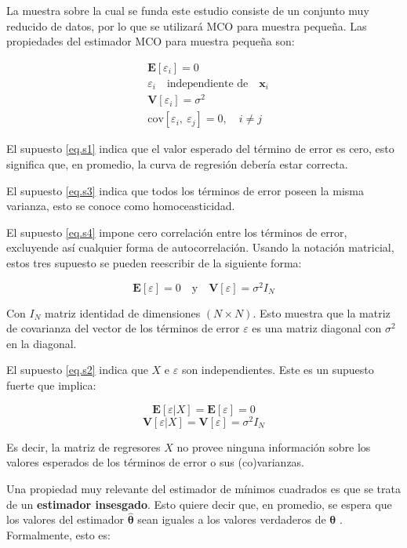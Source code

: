 La muestra sobre la cual se funda este estudio consiste de un conjunto muy reducido de datos, por lo que se utilizará MCO para muestra pequeña. Las propiedades del estimador MCO para muestra pequeña son:

\begin{align}
    & \label{eq.s1} \bm{E}[\varepsilon_i] = 0\\
    & \label{eq.s2} \varepsilon_i\quad\text{independiente de}\quad \bm{x}_i\\
    & \label{eq.s3} \bm{V}[\varepsilon_i]=\sigma^2 \\
    & \label{eq.s4} \text{cov}[\varepsilon_i,~\varepsilon_j] = 0,\quad i\neq j
\end{align}

El supuesto \eqref{eq.s1} indica que el valor esperado del término de error es cero, esto significa que, en promedio, la curva de regresión debería estar correcta. 

El supuesto \eqref{eq.s3} indica que todos los términos de error poseen la misma varianza, esto se conoce como homoceasticidad.

El supuesto \eqref{eq.s4} impone cero correlación entre los términos de error, excluyende así cualquier forma de autocorrelación. Usando la notación matricial, estos tres supuesto se pueden reescribir de la siguiente forma:

\begin{equation}
    \bm{E}[\varepsilon]=0\quad\text{y}\quad\bm{V}[\varepsilon]=\sigma^2I_N
\end{equation}

Con $I_N$ matriz identidad de dimensiones $(N\times N)$. Esto muestra que la matriz de covarianza del vector de los términos de error $\varepsilon$ es una matriz diagonal con $\sigma^2$ en la diagonal.

El supuesto \eqref{eq.s2} indica que $X$ e $\varepsilon$ son independientes. Este es un supuesto fuerte que implica:

\begin{equation}
    \bm{E}[\varepsilon|X]=\bm{E}[\varepsilon]=0
\end{equation}
\begin{equation}
    \bm{V}[\varepsilon|X]=\bm{V}[\varepsilon]=\sigma^2I_N
\end{equation}

Es decir, la matriz de regresores $X$ no provee ninguna información sobre los valores esperados de los términos de error o sus (co)varianzas. 

Una propiedad muy relevante del estimador de mínimos cuadrados es que se trata de un \textbf{estimador insesgado}. Esto quiere decir que, en promedio, se espera que los valores del estimador $\bm{\hat\theta}$ sean iguales a los valores verdaderos de $\bm{\theta}$ \cite{verbeek}. Formalmente, esto es:


